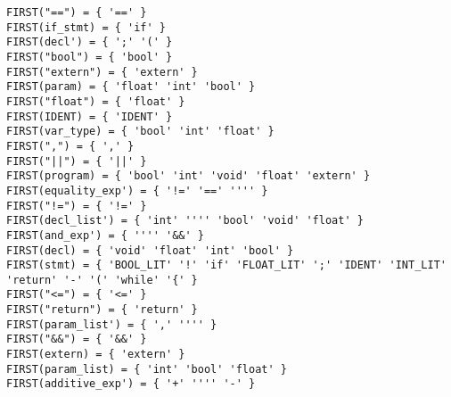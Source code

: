 \documentclass[10pt,a4paper]{article}
\begin{document}
{\begin{verbatim}
FIRST("==") = { '==' }
FIRST(if_stmt) = { 'if' }
FIRST(decl') = { ';' '(' }
FIRST("bool") = { 'bool' }
FIRST("extern") = { 'extern' }
FIRST(param) = { 'float' 'int' 'bool' }
FIRST("float") = { 'float' }
FIRST(IDENT) = { 'IDENT' }
FIRST(var_type) = { 'bool' 'int' 'float' }
FIRST(",") = { ',' }
FIRST("||") = { '||' }
FIRST(program) = { 'bool' 'int' 'void' 'float' 'extern' }
FIRST(equality_exp') = { '!=' '==' '''' }
FIRST("!=") = { '!=' }
FIRST(decl_list') = { 'int' '''' 'bool' 'void' 'float' }
FIRST(and_exp') = { '''' '&&' }
FIRST(decl) = { 'void' 'float' 'int' 'bool' }
FIRST(stmt) = { 'BOOL_LIT' '!' 'if' 'FLOAT_LIT' ';' 'IDENT' 'INT_LIT' 'return' '-' '(' 'while' '{' }
FIRST("<=") = { '<=' }
FIRST("return") = { 'return' }
FIRST(param_list') = { ',' '''' }
FIRST("&&") = { '&&' }
FIRST(extern) = { 'extern' }
FIRST(param_list) = { 'int' 'bool' 'float' }
FIRST(additive_exp') = { '+' '''' '-' }
\end{verbatim}
}
\end{document}

